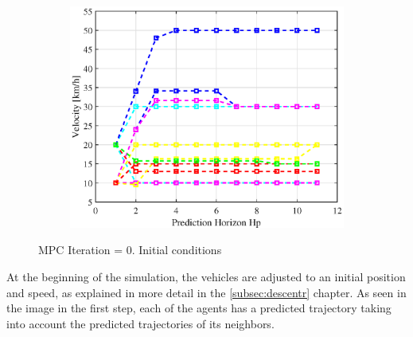 \begin{figure}[h!]
\begin{subfigure}[b]{0.45\textwidth}
    \includegraphics[width=\textwidth]{Kap6/no_restricted/no_restricted_vel0.eps}
    \label{fig:third}
\end{subfigure}
\caption{MPC Iteration = 0. Initial conditions}
\label{fig:figures}
\end{figure}

\vspace{0.5cm}
At the beginning of the simulation, the vehicles are adjusted to an initial position and speed, as explained in more detail in the \ref{subsec:descentr} chapter. As seen in the image in the first step, each of the agents has a predicted trajectory taking into account the predicted trajectories of its neighbors.


